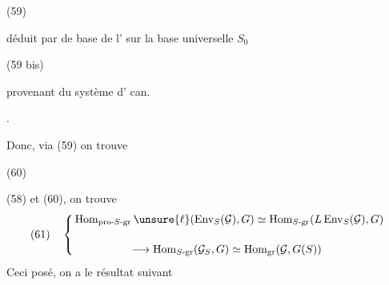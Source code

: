 \begin{samepage}
(59)\quad
{}
\end{samepage}
déduit par  de base de l' sur la base universelle $S_0$

\begin{samepage}
(59 bis)\quad
{}
\end{samepage}
provenant du système d' can.



.

Donc, via (59) on trouve

\begin{samepage}
(60)\quad
{}
\end{samepage}


 (58) et (60), on trouve
\[
(61)\quad\left\{
\begin{aligned}
&\operatorname{Hom}_{\mathrm{pro}\text{-}S\text{-}\mathrm{gr}}\unsure{\ell}
 (\operatorname{Env}_S(\mathcal{G}),G)
 \simeq\operatorname{Hom}_{S\text{-}\mathrm{gr}}(L\operatorname{Env}_S(\mathcal{G}),G)\\[1.2em]
&\hspace{5em}\longrightarrow\operatorname{Hom}_{S\text{-}\mathrm{gr}}(\mathcal{G}_S,G)
 \simeq\operatorname{Hom}_{\mathrm{gr}}(\mathcal{G},G(S))
\end{aligned}\right.
\]
Ceci posé, on a le résultat suivant

